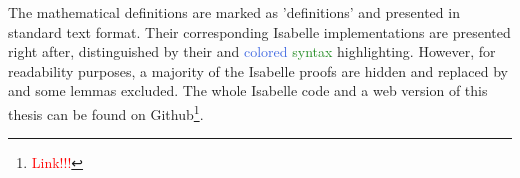 \begin{isabellebody}
\begin{isamarkuptext}
The mathematical definitions are marked as 'definitions' and presented in standard text format. Their corresponding Isabelle implementations
are presented right after, distinguished by their  and \textcolor{RoyalBlue}{colored} \textcolor{ForestGreen}{syntax} \textcolor{Cerulean}{highlighting}.
However, for readability purposes, a majority of the Isabelle proofs are hidden and replaced by \isa{{\isasymproof}} and some lemmas excluded. The whole Isabelle code and a web version of this thesis can be found on Github\footnote{\textcolor{red}{Link!!!}}.%
\end{isamarkuptext}\isamarkuptrue%
%
\isadelimtheory
%
\endisadelimtheory
%
\isatagtheory
%
\endisatagtheory
{\isafoldtheory}%
%
\isadelimtheory
%
\endisadelimtheory
%
\end{isabellebody}%
\endinput
